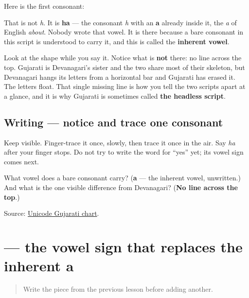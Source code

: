 Here is the first consonant:

\begin{quote}
\end{quote}

That is not \emph{h}. It is \textbf{ha} — the consonant \emph{h} with an \textbf{a} already inside it, the \emph{a} of English \emph{about}. Nobody wrote that vowel. It is there because a bare consonant in this script is understood to carry it, and this is called the \textbf{inherent vowel}.

Look at the shape while you say it. Notice what is \textbf{not} there: no line across the top. Gujarati is Devanagari's sister and the two share most of their skeleton, but Devanagari hangs its letters from a horizontal bar and Gujarati has erased it. The letters float. That single missing line is how you tell the two scripts apart at a glance, and it is why Gujarati is sometimes called \textbf{the headless script}.

\subsection*{Writing — notice and trace one consonant}

Keep \textbf{} visible. Finger-trace it once, slowly, then trace it once in the air. Say \emph{ha} after your finger stops. Do not try to write the word for \textquotedblleft{}yes\textquotedblright{} yet; its vowel sign comes next.

\begin{tcolorbox}[breakable,colback=teal!4,colframe=teal!35!black,title={Before you move on}]
What vowel does a bare consonant carry? (\textbf{a} — the inherent vowel, unwritten.) And what is the one visible difference from Devanagari? (\textbf{No line across the top}.)

Source: \href{https://www.unicode.org/charts/PDF/U0A80.pdf}{Unicode Gujarati chart}.
\end{tcolorbox}
\section[\texorpdfstring{\gu{ા} (-ā)}{ા (-ā)}]{ — the vowel sign that replaces the inherent a}

\label{lesson:GU-W01-aa-matra}



\begin{quote}
Write the piece from the previous lesson before adding another.
\end{quote}

